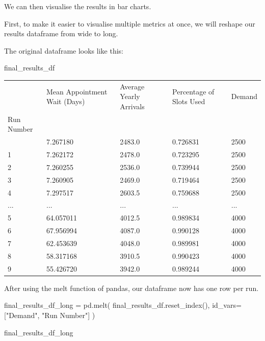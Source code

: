 \documentclass[
  letterpaper,
  DIV=11,
  numbers=noendperiod]{scrreprt}
\newenvironment{Shaded}{\begin{snugshade}}{\end{snugshade}}
\newcommand{\NormalTok}[1]{\textcolor[rgb]{0.00,0.23,0.31}{#1}}
\newcommand{\OperatorTok}[1]{\textcolor[rgb]{0.37,0.37,0.37}{#1}}
\newcommand{\StringTok}[1]{\textcolor[rgb]{0.13,0.47,0.30}{#1}}
\begin{document}
We can then visualise the results in bar charts.

First, to make it easier to visualise multiple metrics at once, we will
reshape our results dataframe from wide to long.

The original dataframe looks like this:

\begin{Shaded}
\begin{Highlighting}[]
\NormalTok{final\_results\_df}
\end{Highlighting}
\end{Shaded}

\begin{longtable}[]{@{}lllll@{}}
\toprule\noalign{}
& Mean Appointment Wait (Days) & Average Yearly Arrivals & Percentage of
Slots Used & Demand \\
Run Number & & & & \\
\midrule\noalign{}
\endhead
\bottomrule\noalign{}
\endlastfoot
0 & 7.267180 & 2483.0 & 0.726831 & 2500 \\
1 & 7.262172 & 2478.0 & 0.723295 & 2500 \\
2 & 7.260255 & 2536.0 & 0.739944 & 2500 \\
3 & 7.260905 & 2469.0 & 0.719464 & 2500 \\
4 & 7.297517 & 2603.5 & 0.759688 & 2500 \\
... & ... & ... & ... & ... \\
5 & 64.057011 & 4012.5 & 0.989834 & 4000 \\
6 & 67.956994 & 4087.0 & 0.990128 & 4000 \\
7 & 62.453639 & 4048.0 & 0.989981 & 4000 \\
8 & 58.317168 & 3910.5 & 0.990423 & 4000 \\
9 & 55.426720 & 3942.0 & 0.989244 & 4000 \\
\end{longtable}

After using the melt function of pandas, our dataframe now has one row
per run.

\begin{Shaded}
\begin{Highlighting}[]
\NormalTok{final\_results\_df\_long }\OperatorTok{=}\NormalTok{ pd.melt(}
\NormalTok{  final\_results\_df.reset\_index(),}
\NormalTok{  id\_vars}\OperatorTok{=}\NormalTok{[}\StringTok{"Demand"}\NormalTok{, }\StringTok{"Run Number"}\NormalTok{]}
\NormalTok{  )}

\NormalTok{final\_results\_df\_long}
\end{Highlighting}
\end{Shaded}
\end{document}
